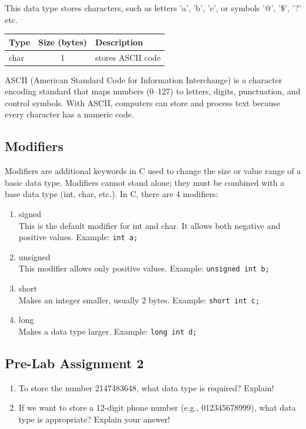 This data type stores characters, such as letters 'a', 'b', 'c', or symbols '@', '\$', '?' etc.
\begin{center}
	\begin{tabular}{|l|c|l|}
		\hline
		\textbf{Type} & \textbf{Size (bytes)} & \textbf{Description} \\ \hline
		char & 1	& stores ASCII code \\ \hline
	\end{tabular}
\end{center}
ASCII (American Standard Code for Information Interchange) is a character encoding standard that maps numbers (0–127) to letters, digits, punctuation, and control symbols.  
With ASCII, computers can store and process text because every character has a numeric code.

\subsection{Modifiers}
Modifiers are additional keywords in C used to change the size or value range of a basic data type.  
Modifiers cannot stand alone; they must be combined with a base data type (int, char, etc.).  
In C, there are 4 modifiers:
\begin{enumerate}
	\item signed \\ 
	This is the default modifier for int and char. It allows both negative and positive values.  
	Example: \texttt{int a;}
	\item unsigned \\ 
	This modifier allows only positive values.  
	Example: \texttt{unsigned int b;}
	\item short \\ 
	Makes an integer smaller, usually 2 bytes.  
	Example: \texttt{short int c;}
	\item long \\ 
	Makes a data type larger.  
	Example: \texttt{long int d;}
\end{enumerate}

\subsection*{Pre-Lab Assignment 2}
\begin{enumerate}
	\item To store the number 2147483648, what data type is required? Explain!
	\item If we want to store a 12-digit phone number (e.g., 012345678999), what data type is appropriate? Explain your answer!
\end{enumerate}


